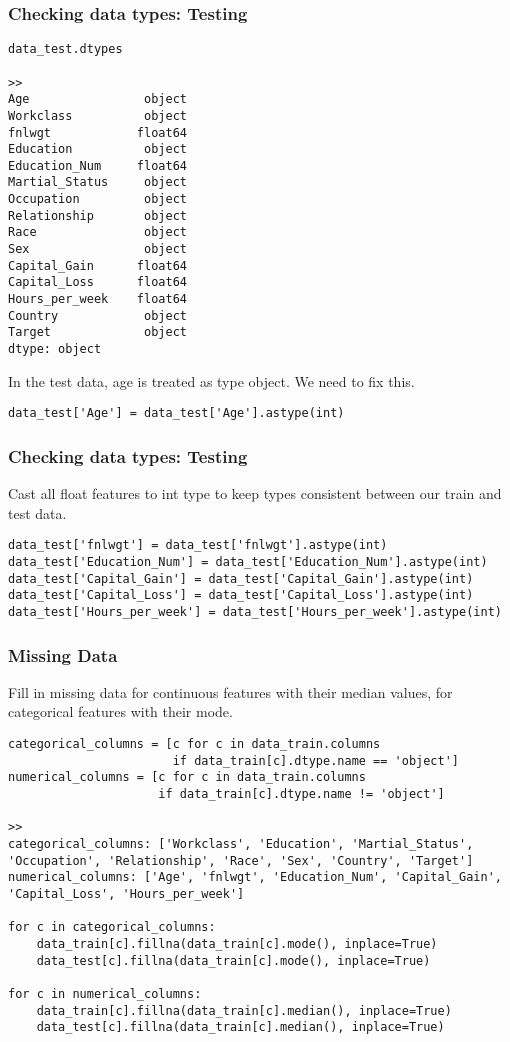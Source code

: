\begin{frame}[fragile]\frametitle{Checking data types: Testing}	
\begin{lstlisting}
data_test.dtypes

>>
Age                object
Workclass          object
fnlwgt            float64
Education          object
Education_Num     float64
Martial_Status     object
Occupation         object
Relationship       object
Race               object
Sex                object
Capital_Gain      float64
Capital_Loss      float64
Hours_per_week    float64
Country            object
Target             object
dtype: object
\end{lstlisting}
In the test data, age is treated as type object. We need to fix this.
\begin{lstlisting}
data_test['Age'] = data_test['Age'].astype(int)
\end{lstlisting}
\end{frame}

\begin{frame}[fragile]\frametitle{Checking data types: Testing}	
Cast all float features to int type to keep types consistent between our train and test data.
\begin{lstlisting}
data_test['fnlwgt'] = data_test['fnlwgt'].astype(int)
data_test['Education_Num'] = data_test['Education_Num'].astype(int)
data_test['Capital_Gain'] = data_test['Capital_Gain'].astype(int)
data_test['Capital_Loss'] = data_test['Capital_Loss'].astype(int)
data_test['Hours_per_week'] = data_test['Hours_per_week'].astype(int)
\end{lstlisting}
\end{frame}

\begin{frame}[fragile]\frametitle{Missing Data}	
Fill in missing data for continuous features with their median values, for categorical features with their mode.

\begin{lstlisting}
categorical_columns = [c for c in data_train.columns 
                       if data_train[c].dtype.name == 'object']
numerical_columns = [c for c in data_train.columns 
                     if data_train[c].dtype.name != 'object']

>>
categorical_columns: ['Workclass', 'Education', 'Martial_Status', 'Occupation', 'Relationship', 'Race', 'Sex', 'Country', 'Target']
numerical_columns: ['Age', 'fnlwgt', 'Education_Num', 'Capital_Gain', 'Capital_Loss', 'Hours_per_week']

for c in categorical_columns:
    data_train[c].fillna(data_train[c].mode(), inplace=True)
    data_test[c].fillna(data_train[c].mode(), inplace=True)
    
for c in numerical_columns:
    data_train[c].fillna(data_train[c].median(), inplace=True)
    data_test[c].fillna(data_train[c].median(), inplace=True)

\end{lstlisting}
\end{frame}

